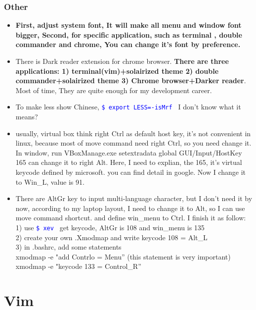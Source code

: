 \documentclass[a4paper,11pt,twoside]{book}
\newcommand{\linuxcommand}[1]{\texttt{\textcolor{blue}{\$ #1 \Pisymbol{psy}{191}}}}
\begin{document}
\subsection{Other}
\begin{itemize}
		\item \textbf{First, adjust system font, It will make all menu and window font bigger, Second, for specific application, such as terminal , double commander and chrome, You can change it's font by preference. }

		\item There is Dark reader extension for chrome browser. \textbf{There are three applications: 1) terminal(vim)+solairized theme 2) double commander+solairized theme 3) Chrome browser+Darker reader}. Most of time, They are quite enough for my development career. 

		\item To make less show Chinese, \linuxcommand{export LESS=-isMrf} I don't know what it means?

		\item usually, virtual box think right Ctrl as default host key, it's not convenient in linux, because most of move command need right Ctrl, so you need change it.  In window, run VBoxManage.exe setextradata global GUI/Input/HostKey 165 can change it to right Alt. Here, I need to explian, the 165, it's virtual keycode defined by microsoft. you can find detail in google. Now I change it to Win\_L, value is 91.

		\item There are AltGr key to input multi-language character, but I don't need it by now, according to my laptop layout, I need to change it to Alt, so I can use move command shortcut. and define win\_menu to Ctrl. I finish it as follow: \\
	1) use \linuxcommand{xev} get keycode, AltGr is 108 and win\_menu is 135 \\
	2) create your own .Xmodmap and write keycode 108 = Alt\_L\\
	3) in .bashrc, add some statements\\
	xmodmap -e "add Contrlo = Menu'' (this statement is very important)\\
	xmodmap -e "keycode 133 = Control\_R''\\
	\end{itemize}	

	
\chapter{Vim}
\end{document}
